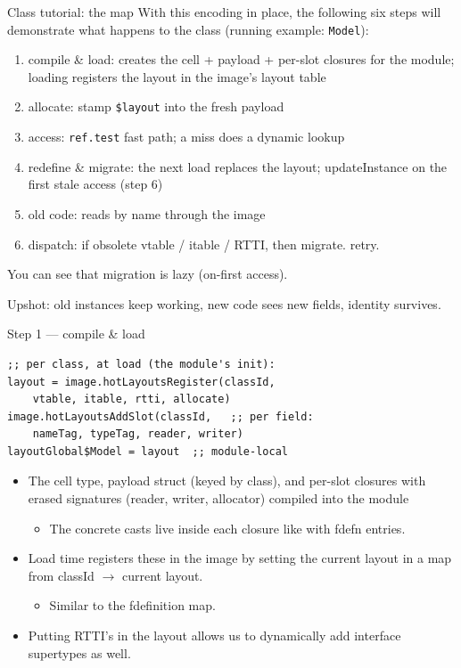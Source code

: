 \documentclass[10pt,presentation]{beamer}
\begin{document}
\begin{frame}[label={sec:org27f9a17},fragile]{Class tutorial: the map}
 With this encoding in place, the following six steps will demonstrate
what happens to the class (running example: \texttt{Model}):

\begin{enumerate}
\item \alert{compile \& load}: creates the cell + payload + per-slot closures
for the module; loading registers the layout in the image's layout
table
\item \alert{allocate}: stamp \texttt{\$layout} into the fresh payload
\item \alert{access}: \texttt{ref.test} fast path; a miss does a dynamic lookup
\item \alert{redefine \& migrate}: the next load replaces the layout;
updateInstance on the first stale access (step 6)
\item \alert{old code}: reads by name through the image
\item \alert{dispatch}: if obsolete vtable / itable / RTTI, then
migrate. retry.
\end{enumerate}

You can see that migration is lazy (on-first access).

Upshot: \alert{old instances keep working, new code sees new fields,
identity survives.}
\end{frame}
\begin{frame}[label={sec:orgd6f4ae4},fragile]{Step 1 — compile \& load}
 \begin{verbatim}
;; per class, at load (the module's init):
layout = image.hotLayoutsRegister(classId,
    vtable, itable, rtti, allocate)
image.hotLayoutsAddSlot(classId,   ;; per field:
    nameTag, typeTag, reader, writer)
layoutGlobal$Model = layout  ;; module-local
\end{verbatim}
\begin{itemize}
\item The cell type, payload struct (keyed by class), and per-slot
closures with erased signatures (reader, writer, allocator) compiled
into the module
\begin{itemize}
\item The concrete casts live \alert{inside} each closure like with fdefn entries.
\end{itemize}
\item Load time registers these in the image by setting the current layout
in a map from classId \(\to\) current layout.
\begin{itemize}
\item Similar to the fdefinition map.
\end{itemize}
\item Putting RTTI's in the layout allows us to dynamically add interface
supertypes as well.
\end{itemize}
\end{frame}
\end{document}
